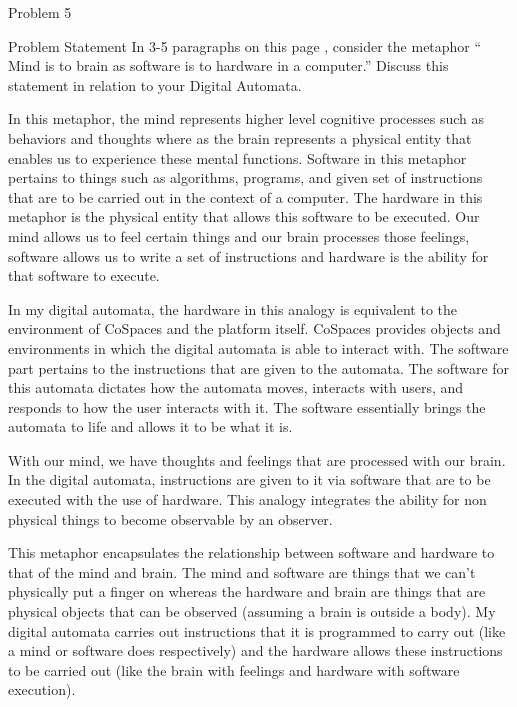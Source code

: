 \begin{problem}{Problem 5}
    \begin{statement}{Problem Statement}
        In 3-5 paragraphs on this page , consider the metaphor “ Mind is to brain as software is to hardware in a computer.” Discuss this statement in relation to your Digital Automata.
    \end{statement}

    \begin{highlight}[Response]
        In this metaphor, the mind represents higher level cognitive processes such as behaviors and thoughts where as the brain represents a physical entity that enables us to experience these mental functions. Software in this
        metaphor pertains to things such as algorithms, programs, and given set of instructions that are to be carried out in the context of a computer. The hardware in this metaphor is the physical entity that allows this software
        to be executed. Our mind allows us to feel certain things and our brain processes those feelings, software allows us to write a set of instructions and hardware is the ability for that software to execute.

        In my digital automata, the hardware in this analogy is equivalent to the environment of CoSpaces and the platform itself. CoSpaces provides objects and environments in which the digital automata is able to interact with. The 
        software part pertains to the instructions that are given to the automata. The software for this automata dictates how the automata moves, interacts with users, and responds to how the user interacts with it. The software 
        essentially brings the automata to life and allows it to be what it is. 

        With our mind, we have thoughts and feelings that are processed with our brain. In the digital automata, instructions are given to it via software that are to be executed with the use of hardware. This analogy integrates the 
        ability for non physical things to become observable by an observer.

        This metaphor encapsulates the relationship between software and hardware to that of the mind and brain. The mind and software are things that we can't physically put a finger on whereas the hardware and brain are things that
        are physical objects that can be observed (assuming a brain is outside a body). My digital automata carries out instructions that it is programmed to carry out (like a mind or software does respectively) and the hardware allows
        these instructions to be carried out (like the brain with feelings and hardware with software execution).
    \end{highlight}
\end{problem}

